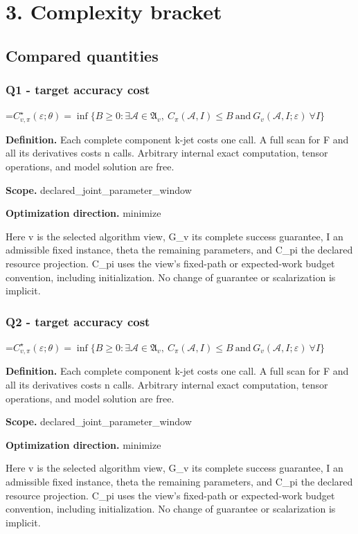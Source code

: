 \documentclass[10pt,a4paper]{article}
\newcommand{\AtlasMath}[1]{\par\begingroup\centering\setbox0=\hbox{$\displaystyle #1$}\ifdim\wd0>1.4\linewidth\typeout{ATLAS WIDE FORMULA: \the\wd0}\fi\ifdim\wd0>\linewidth\resizebox{\linewidth}{!}{\box0}\else\box0\fi\par\endgroup}
\begin{document}
\section{3. Complexity bracket}
\subsection{Compared quantities}
\subsubsection{Q1 - target accuracy cost}
\AtlasMath{C^\star_{v,\pi}(\varepsilon;\theta)=\inf\{B\ge0:\exists\mathcal A\in\mathfrak A_v,\ C_\pi(\mathcal A,I)\le B\ \text{and}\ G_v(\mathcal A,I;\varepsilon)\ \forall I\}}
\textbf{Definition.} Each complete component k-jet costs one call. A full scan for F and all its derivatives costs n calls. Arbitrary internal exact computation, tensor operations, and model solution are free.

\textbf{Scope.} declared\_joint\_parameter\_window

\textbf{Optimization direction.} minimize

Here v is the selected algorithm view, G\_v its complete success guarantee, I an admissible fixed instance, theta the remaining parameters, and C\_pi the declared resource projection. C\_pi uses the view's fixed-path or expected-work budget convention, including initialization. No change of guarantee or scalarization is implicit.

\subsubsection{Q2 - target accuracy cost}
\AtlasMath{C^\star_{v,\pi}(\varepsilon;\theta)=\inf\{B\ge0:\exists\mathcal A\in\mathfrak A_v,\ C_\pi(\mathcal A,I)\le B\ \text{and}\ G_v(\mathcal A,I;\varepsilon)\ \forall I\}}
\textbf{Definition.} Each complete component k-jet costs one call. A full scan for F and all its derivatives costs n calls. Arbitrary internal exact computation, tensor operations, and model solution are free.

\textbf{Scope.} declared\_joint\_parameter\_window

\textbf{Optimization direction.} minimize

Here v is the selected algorithm view, G\_v its complete success guarantee, I an admissible fixed instance, theta the remaining parameters, and C\_pi the declared resource projection. C\_pi uses the view's fixed-path or expected-work budget convention, including initialization. No change of guarantee or scalarization is implicit.
\end{document}
